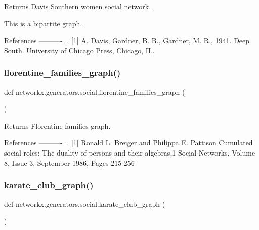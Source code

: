 \begin{DoxyVerb}Returns Davis Southern women social network.

This is a bipartite graph.

References
----------
.. [1] A. Davis, Gardner, B. B., Gardner, M. R., 1941. Deep South.
    University of Chicago Press, Chicago, IL.
\end{DoxyVerb}
 \mbox{\label{namespacenetworkx_1_1generators_1_1social_ad36dd0e3530c42e16740256a8aeee2fc}} 
\subsubsection{\texorpdfstring{florentine\+\_\+families\+\_\+graph()}{florentine\_families\_graph()}}
{\footnotesize\ttfamily def networkx.\+generators.\+social.\+florentine\+\_\+families\+\_\+graph (\begin{DoxyParamCaption}{ }\end{DoxyParamCaption})}

\begin{DoxyVerb}Returns Florentine families graph.

References
----------
.. [1] Ronald L. Breiger and Philippa E. Pattison
   Cumulated social roles: The duality of persons and their algebras,1
   Social Networks, Volume 8, Issue 3, September 1986, Pages 215-256
\end{DoxyVerb}
 \mbox{\label{namespacenetworkx_1_1generators_1_1social_a655d10aaddb72a9260bcfbc7d24f14dc}} 
\subsubsection{\texorpdfstring{karate\+\_\+club\+\_\+graph()}{karate\_club\_graph()}}
{\footnotesize\ttfamily def networkx.\+generators.\+social.\+karate\+\_\+club\+\_\+graph (\begin{DoxyParamCaption}{ }\end{DoxyParamCaption})}

